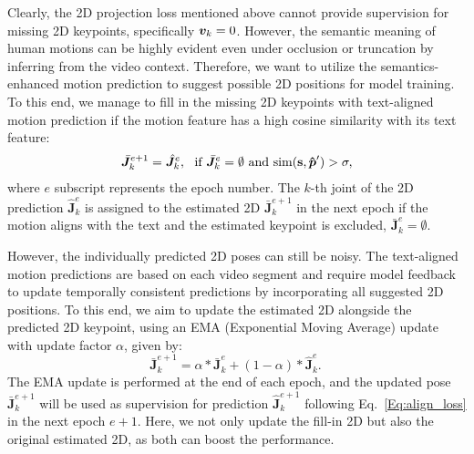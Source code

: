 Clearly, the 2D projection loss mentioned above cannot provide supervision for missing 2D keypoints, specifically ${\bm{v}}_k=0$.  
However, the semantic meaning of human motions can be highly evident even under occlusion or truncation by inferring from the video context. 
Therefore, we want to utilize 
{the semantics-enhanced motion prediction}
to suggest possible 2D positions for model training.
To this end, we manage to fill in the missing 2D keypoints with text-aligned {motion prediction} if the motion feature has a high cosine similarity with its text feature:
\begin{equation}
\begin{aligned}
\bar{\bm{J}}^{e+1}_k=\hat{\bm{J}}^e_k, \text{~~if }  \bar{\bm{J}}^e_k=\emptyset \text{ and } \text{sim}
    {({\mathbf{s}},\boldsymbol{\hat{{\bm{p}}}}'})> \sigma,   
\end{aligned}
\label{Eq:2d_fill}
\end{equation}
where $e$ subscript represents the epoch number. 
The $k$-th joint of the 2D prediction $\hat{\bm{J}}^e_k$ is assigned to the estimated 2D $\bar{\bm{J}}^{e+1}_k$ in the next epoch if the motion aligns with the text and the estimated keypoint is excluded, \ie $\bar{\bm{J}}^e_k=\emptyset$.

However, the individually predicted 2D poses can still be noisy. 
The text-aligned motion predictions are based on each video segment and require model feedback to update temporally consistent predictions by incorporating all suggested 2D positions.
To this end, we aim to update the estimated 2D alongside the predicted 2D keypoint, using an EMA (Exponential Moving Average) update
with update factor $\alpha$, given by:
\begin{equation}
    \bar{\bm{J}}^{e+1}_k= \alpha*\bar{\bm{J}}^e_k+(1-\alpha)*\hat{\bm{J}}^e_k. 
    ~\label{Eq:2d_ema}
\end{equation}
The EMA update is performed at the end of each epoch, and the updated pose
{$\bar{\bm{J}}^{e+1}_k$ will be used as supervision for prediction $\hat{\bm{J}}^{e+1}_k$ following Eq.~\ref{Eq:align_loss} in the next epoch $e+1$.}
Here, we not only update the fill-in 2D but also the original estimated 2D, as both can boost the performance.


